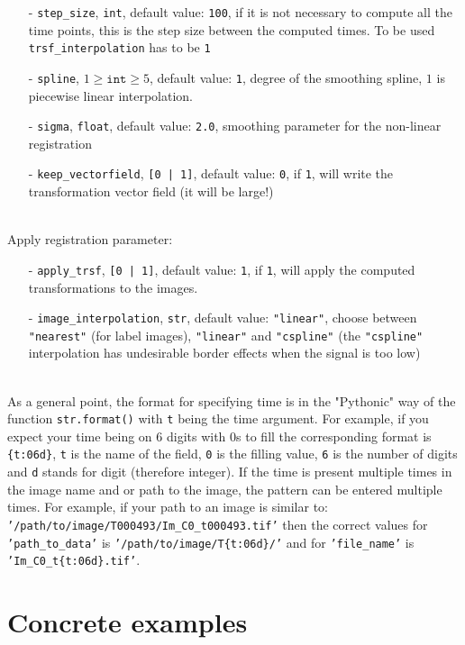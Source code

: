 \documentclass[10pt,a4paper]{book}
\newcommand{\option}[1]{{\texttt{'#1'}}}
\begin{document}
\begin{itemize}
\item[-] \texttt{step\_size}, \texttt{int}, default value: \texttt{100}, if it is not necessary to compute all the time points, this is the step size between the computed times. To be used \texttt{trsf\_interpolation} has to be \texttt{1}
\item[-] \texttt{spline}, $1\geq \texttt{int} \geq 5$, default value: \texttt{1}, degree of the smoothing spline, $1$ is piecewise linear interpolation.
\item[-] \texttt{sigma}, \texttt{float}, default value: \texttt{2.0}, smoothing parameter for the non-linear registration
\item[-] \texttt{keep\_vectorfield}, \texttt{[0 | 1]}, default value: \texttt{0}, if \texttt{1}, will write the transformation vector field (it will be large!)
\end{itemize}~\\
Apply registration parameter:
\begin{itemize}
\item[-] \texttt{apply\_trsf}, \texttt{[0 | 1]}, default value: \texttt{1}, if \texttt{1}, will apply the computed transformations to the images.
\item[-] \texttt{image\_interpolation}, \texttt{str}, default value: \texttt{"linear"}, choose between \texttt{"nearest"} (for label images), \texttt{"linear"} and \texttt{"cspline"} (the \texttt{"cspline"} interpolation has undesirable border effects when the signal is too low)
\end{itemize}~\\
As a general point, the format for specifying time is in the "Pythonic" way of the function \texttt{str.format()} with \texttt{t} being the time argument. For example, if you expect your time being on 6 digits with 0s to fill the corresponding format is \texttt{\{t:06d\}}, \texttt{t} is the name of the field, \texttt{0} is the filling value, \texttt{6} is the number of digits and \texttt{d} stands for digit (therefore integer). If the time is present multiple times in the image name and or path to the image, the pattern can be entered multiple times. For example, if your path to an image is similar to: \option{/path/to/image/T000493/Im\_C0\_t000493.tif} then the correct values for \option{path\_to\_data} is \option{/path/to/image/T\{t:06d\}/} and for \option{file\_name} is \option{Im\_C0\_t\{t:06d\}.tif}.
\section{Concrete examples}
\end{document}
